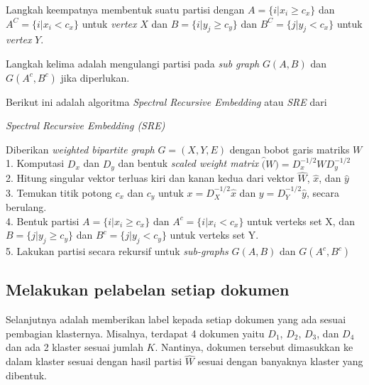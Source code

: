 Langkah keempatnya membentuk suatu partisi dengan $A = \{i | x_i \geq c_x\}$ dan $A^C = \{i | x_i < c_x\}$ untuk \textit{vertex} $X$ dan $B = \{i | y_j \geq c_y\}$ dan $B^C = \{j | y_j < c_x\}$ untuk \textit{vertex} $Y$.

Langkah kelima adalah mengulangi partisi pada \textit{sub graph} $G(A,B)$ dan $G(A^c,B^c)$ jika diperlukan.

Berikut ini adalah algoritma \textit{Spectral Recursive Embedding} atau \textit{SRE} dari \citep*{zha2001bgp}

\begin{algorithm}[H]
\caption{\textit{\textit{Spectral Recursive Embedding (SRE)}} \citep*{zha2001bgp}}\label{alg:sre}
\begin{algorithmic}

\State Diberikan \textit{weighted bipartite graph} $G = (X, Y, E)$ dengan bobot garis matriks $W$ \\

1. Komputasi $D_x$ dan $D_y$ dan bentuk \textit{scaled weight matrix} $\hat(W) = D_x^{-1/2} W D_y^{-1/2}$ \\

2. Hitung singular vektor terluas kiri dan kanan kedua dari vektor $\hat{W}$, $\hat{x}$, dan $\hat{y}$ \\

3. Temukan titik potong $c_x$ dan $c_y$ untuk $x = D_X^{-1/2} \hat{x}$ dan $y = D_Y^{-1/2} \hat{y}$, secara berulang. \\

4. Bentuk partisi $A = \{i | x_i \geq c_x\}$ dan $A^c = \{i | x_i < c_x\}$ untuk verteks set X, dan  $B = \{j | y_j \geq c_y\}$ dan $B^c = \{j | y_j < c_y\}$ untuk verteks set Y. \\

5. Lakukan partisi secara rekursif untuk \textit{sub-graphs} $G(A, B)$ dan $G(A^c, B^c)$ \\

\end{algorithmic}
\end{algorithm}

\subsection{Melakukan pelabelan setiap dokumen}

Selanjutnya adalah memberikan label kepada setiap dokumen yang ada sesuai pembagian klasternya. Misalnya, terdapat 4 dokumen yaitu $D_1$, $D_2$, $D_3$, dan $D_4$ dan ada 2 klaster sesuai jumlah $K$. Nantinya, dokumen tersebut dimasukkan ke dalam klaster sesuai dengan hasil partisi $\hat{W}$ sesuai dengan banyaknya klaster yang dibentuk.

